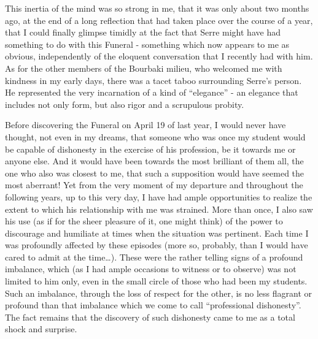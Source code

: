 This inertia of the mind was so strong in me, that it was only about two months ago, at
the end of a long reflection that had taken place over the course of a year, that I could
finally glimpse timidly at the fact that Serre might have had something to do with this
Funeral - something which now appears to me as obvious, independently of the eloquent
conversation that I recently had with him. 
As for the other members of the Bourbaki milieu, who welcomed me with kindness in my early
days, there was a tacet taboo surrounding Serre's person.
He represented the very incarnation of a kind of ``elegance'' - an elegance that includes
not only form, but also rigor and a scrupulous probity.

Before discovering the Funeral on April 19 of last year, I would never have thought, not
even in my dreams, that someone who was once my student 
would be capable of dishonesty in the exercise of his profession, 
be it towards me or anyone else.
And it would have been towards the most brilliant of them all, the one who also was
closest to me, that such a supposition would have seemed the most aberrant!
Yet from the very moment of my departure and throughout the following years, up to this
very day, I have had ample opportunities to realize the extent to which his relationship
with me was strained. More than once, I also saw his use (as if for the sheer pleasure of
it, one might think) of the power to discourage and humiliate at times when the situation
was pertinent. Each time I was profoundly affected by these episodes (more so, probably,
than I would have cared to admit at the time\ldots). These were the rather telling signs
of a profound imbalance, which (as I had ample occasions to witness or to observe)
was not limited to him only, 
even in the small circle of those who had been my students. 
Such an imbalance, through the loss of respect for the other, is no less flagrant or
profound than that imbalance which we come to call ``professional dishonesty''. 
The fact remains that 
the discovery of such dishonesty came to me as a total shock and
surprise. 

